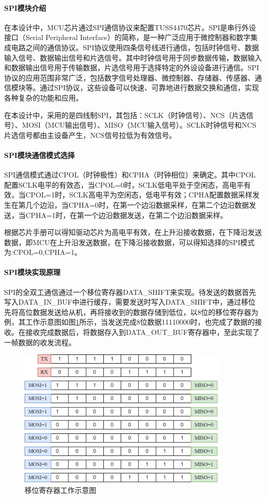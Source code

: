     \paragraph{SPI模块介绍}
    在本设计中，MCU芯片通过SPI通信协议来配置TUSS4470芯片。SPI是串行外设接口（Serial Peripheral Interface）的简称，是一种广泛应用于微控制器和数字集成电路之间的通信协议。SPI协议使用四条信号线进行通信，包括时钟信号、数据输入信号、数据输出信号和片选信号。其中时钟信号用于同步数据传输，数据输入和数据输出信号用于传输数据，片选信号用于选择特定的外设设备进行通信。SPI协议的应用范围非常广泛，包括数字信号处理器、微控制器、存储器、传感器、通信模块等。通过SPI协议，这些设备可以快速、可靠地进行数据交换和通信，实现各种复杂的功能和应用。
    
    在本设计中，采用的是四线制SPI，其包括：SCLK（时钟信号）、NCS（片选信号）、MOSI（MCU输出信号）、MISO（MCU输入信号）。SCLK时钟信号和NCS片选信号都由主设备产生，NCS信号拉低为有效信号。
	\noindent
    \paragraph{SPI模块通信模式选择}
    SPI通信模式通过CPOL（时钟极性）和CPHA（时钟相位）来确定。其中CPOL配置SCLK电平的有效态，当CPOL=0时，SCLK低电平处于空闲态，高电平有效，当CPOL=1时，SCLK高电平为空闲态，低电平有效；CPHA配置数据采样发生在第几个边沿，当CPHA=0时，在第一个边沿数据采样，在第二个边沿数据发送，当CPHA=1时，在第一个边沿数据发送，在第二个边沿数据采样。\par
    根据芯片手册可以得知驱动芯片为高电平有效，在上升沿接收数据，在下降沿发送数据，即MCU在上升沿发送数据，在下降沿接收数据，可以得知选择的SPI模式为:CPOL=0,CPHA=1。
    \noindent
    \paragraph{SPI模块实现原理}
    SPI的全双工通信通过一个移位寄存器DATA\_SHIFT来实现。待发送的数据首先写入DATA\_IN\_BUF中进行缓存，需要发送时写入DATA\_SHIFT中，通过移位先将高位数据发送给从机，再将接收到的数据存储到低位，以8位的移位寄存器为例，其工作示意图如图\ref{移位寄存器工作示意图}所示，当发送完成8位数据11110000时，也完成了数据的接收。在接收完成数据后，将数据存入到DATA\_OUT\_BUF寄存器中，至此实现了一帧数据的收发流程。
        \begin{figure}[ht]
        \centering
        \includegraphics[width=10cm]{figure/DATA_SHIFT.png}
        \caption{移位寄存器工作示意图}
        \label{移位寄存器工作示意图}
    \end{figure}
    \noindent
